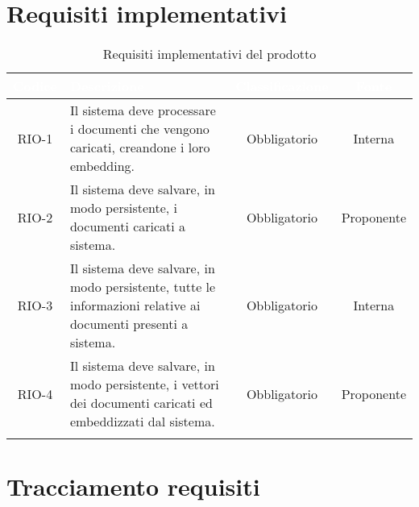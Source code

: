 \section{Requisiti implementativi}
\begingroup
\setlength{\tabcolsep}{10pt}
\renewcommand{\arraystretch}{1.5}
\begin{xltabular}{\textwidth}{| c | X | c | c |}
    \hline
     \textbf{\textcolor{white}{Codice}} & \textbf{\textcolor{white}{Descrizione}} & \textbf{\textcolor{white}{Classificazione}} & \textbf{\textcolor{white}{Fonte}}\\
    \hline
    \endhead
    RIO-1 & Il sistema deve processare i documenti che vengono caricati, creandone i loro embedding. & Obbligatorio & Interna\\
    \hline
    RIO-2 & Il sistema deve salvare, in modo persistente, i documenti caricati a sistema. & Obbligatorio & Proponente\\
    \hline
    RIO-3 & Il sistema deve salvare, in modo persistente, tutte le informazioni relative ai documenti presenti a sistema. & Obbligatorio & Interna\\
    \hline
    RIO-4 & Il sistema deve salvare, in modo persistente, i vettori dei documenti caricati ed embeddizzati dal sistema. & Obbligatorio & Proponente\\
    \hline
    
     \caption{Requisiti implementativi del prodotto}
    \label{tab:reqimp}
\end{xltabular}
\endgroup
\newpage
\section{Tracciamento requisiti}

